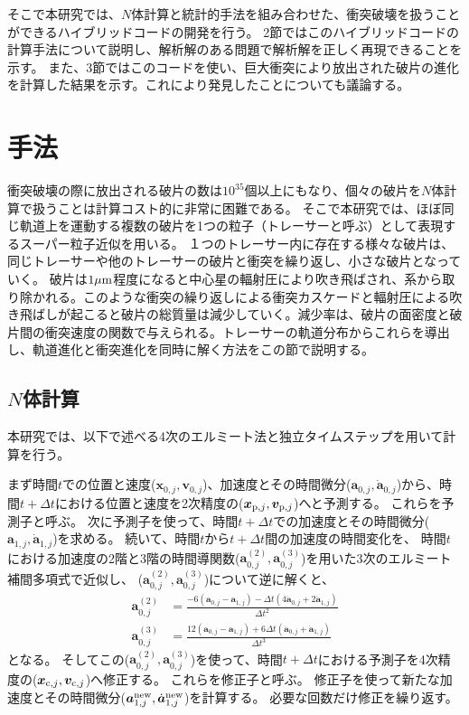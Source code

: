 \documentclass[a4paper,10pt,oneside,twocolumn,notitlepage,final]{jarticle}
\begin{document}
そこで本研究では、$N$体計算と統計的手法を組み合わせた、衝突破壊を扱うことができるハイブリッドコードの開発を行う。
2節ではこのハイブリッドコードの計算手法について説明し、解析解のある問題で解析解を正しく再現できることを示す。
また、3節ではこのコードを使い、巨大衝突により放出された破片の進化を計算した結果を示す。これにより発見したことについても議論する。


\section{手法}
衝突破壊の際に放出される破片の数は$10^{35}$個以上にもなり、個々の破片を$N$体計算で扱うことは計算コスト的に非常に困難である。
そこで本研究では、ほぼ同じ軌道上を運動する複数の破片を1つの粒子（トレーサーと呼ぶ）として表現するスーパー粒子近似を用いる。
１つのトレーサー内に存在する様々な破片は、同じトレーサーや他のトレーサーの破片と衝突を繰り返し、小さな破片となっていく。
破片は$1\mu {\rm m}$程度になると中心星の輻射圧により吹き飛ばされ、系から取り除かれる。このような衝突の繰り返しによる衝突カスケードと輻射圧による吹き飛ばしが起こると破片の総質量は減少していく。減少率は、破片の面密度と破片間の衝突速度の関数で与えられる\citep{Kobayashi_Tanaka_2010}。トレーサーの軌道分布からこれらを導出し、軌道進化と衝突進化を同時に解く方法をこの節で説明する。

\subsection{$N$体計算}
本研究では、以下で述べる4次のエルミート法\citep{Makino_Aarseth_1992}と独立タイムステップを用いて計算を行う。

まず時間$t$での位置と速度(${\bm x}_{0,j},{\bm v}_{0,j}$)、加速度とその時間微分(${\bm a}_{0,j},\dot{{\bm a}}_{0,j}$)から、時間$t + \Delta t$における位置と速度を2次精度の(${\bm x}_{{\rm p},j} , {\bm v}_{{\rm p},j}$)へと予測する。
これらを予測子と呼ぶ。
次に予測子を使って、時間$t + \Delta t$での加速度とその時間微分(${\bm a}_{1,j},\dot{{\bm a}}_{1,j}$)を求める。
続いて、時間$t$から$t+\Delta t$間の加速度の時間変化を、
時間$t$における加速度の2階と3階の時間導関数(${\bm a}_{0,j}^{(2)},{\bm a}_{0,j}^{(3)}$)を用いた3次のエルミート補間多項式で近似し、
(${\bm a}_{0,j}^{(2)},{\bm a}_{0,j}^{(3)}$)について逆に解くと、
\begin{align}
{\bm a}_{0,j}^{(2)} &= \frac{- 6 ({\bm a}_{0,j} - {\bm a}_{1,j}) - \Delta t (4 \dot{{\bm a}}_{0,j} + 2 \dot{{\bm a}}_{1,j})}{\Delta t ^2}\\
{\bm a}_{0,j}^{(3)} &= \frac{12 ({\bm a}_{0,j} - {\bm a}_{1,j}) + 6 \Delta t (\dot{{\bm a}}_{0,j} + \dot{{\bm a}}_{1,j})}{\Delta t ^3}
\end{align}
となる。
そしてこの(${\bm a}_{0,j}^{(2)},{\bm a}_{0,j}^{(3)}$)を使って、時間$t + \Delta t$における予測子を4次精度の(${\bm x}_{{\rm c},j} , {\bm v}_{{\rm c},j}$)へ修正する。
これらを修正子と呼ぶ。
修正子を使って新たな加速度とその時間微分(${\bm a}_{1,j}^{\rm new},\dot{{\bm a}}_{1,j}^{\rm new}$)を計算する。
必要な回数だけ修正を繰り返す。
\end{document}
